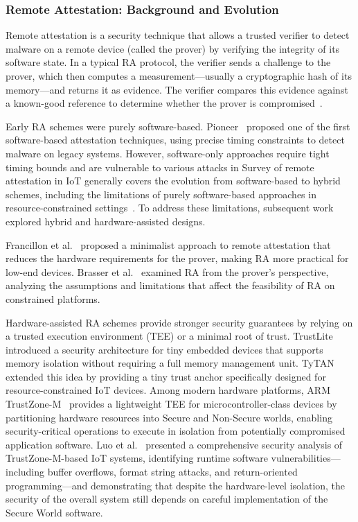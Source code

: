 \documentclass[a4paper,10pt]{article}
\begin{document}
\subsubsection{Remote Attestation: Background and Evolution}

Remote attestation is a security technique that allows a trusted
verifier to detect malware on a remote device (called the prover)
by verifying the integrity of its software state. In a typical RA
protocol, the verifier sends a challenge to the prover, which then
computes a measurement---usually a cryptographic hash of its
memory---and returns it as evidence. The verifier compares this
evidence against a known-good reference to determine whether the
prover is compromised~\cite{kuang2022survey}.

Early RA schemes were purely software-based. Pioneer~\cite{seshadri2005pioneer}
proposed one of the first software-based attestation techniques,
using precise timing constraints to detect malware on legacy
systems. However, software-only approaches require tight timing
bounds and are vulnerable to various attacks in
Survey of remote attestation in IoT generally covers the
evolution from software-based to hybrid schemes, including
the limitations of purely software-based approaches in
resource-constrained settings~\cite{ankergard2021software,kuang2022survey}. To address these limitations,
subsequent work explored hybrid and hardware-assisted designs.

Francillon et al.~\cite{francillon2014minimalist} proposed a
minimalist approach to remote attestation that reduces the
hardware requirements for the prover, making RA more practical for
low-end devices. Brasser et al.~\cite{brasser2016remote} examined
RA from the prover's perspective, analyzing the assumptions and
limitations that affect the feasibility of RA on constrained
platforms.

Hardware-assisted RA schemes provide stronger security guarantees
by relying on a trusted execution environment (TEE) or a minimal
root of trust. TrustLite~\cite{koeberl2014trustlite} introduced a
security architecture for tiny embedded devices that supports
memory isolation without requiring a full memory management unit.
TyTAN~\cite{brasser2015tytan} extended this idea by providing a
tiny trust anchor specifically designed for resource-constrained
IoT devices. Among modern hardware platforms, ARM
TrustZone-M~\cite{trustzone2025} provides a lightweight TEE for
microcontroller-class devices by partitioning hardware resources
into Secure and Non-Secure worlds, enabling security-critical
operations to execute in isolation from potentially compromised
application software. Luo et al.~\cite{luo2022trustzone} presented a
comprehensive security analysis of TrustZone-M-based IoT systems,
identifying runtime software vulnerabilities---including buffer
overflows, format string attacks, and return-oriented
programming---and demonstrating that despite the hardware-level
isolation, the security of the overall system still depends on
careful implementation of the Secure World software.
\end{document}
